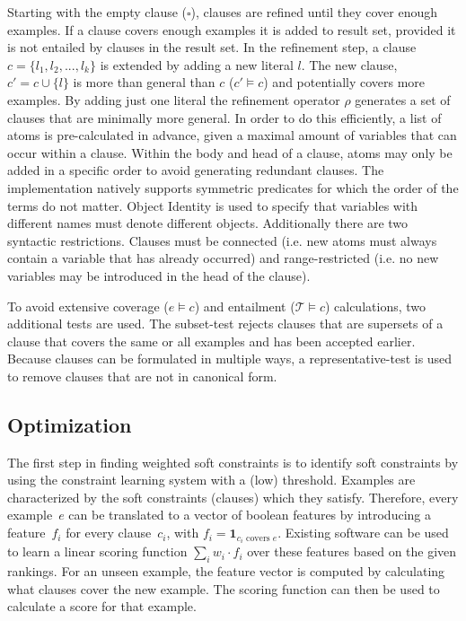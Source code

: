 \documentclass[letterpaper]{article}
\newcommand{\sym}[1]{\ensuremath{\mathcal{#1}}}
\theoremstyle{definition}
\begin{document}
Starting with the empty clause ($\square$), clauses are refined until they cover enough examples.
If a clause covers enough examples it is added to result set, provided it is not entailed by clauses in the result set.
In the refinement step, a clause $c = \{l_1, l_2, ..., l_k\}$ is extended by adding a new literal $l$.
The new clause, $c' = c \cup \{l\}$ is more than general than $c$ ($c' \models c$) and potentially covers more examples.
By adding just one literal the refinement operator $\rho$ generates a set of clauses that are minimally more general.
In order to do this efficiently, a list of atoms is pre-calculated in advance, given a maximal amount of variables that can occur within a clause.
Within the body and head of a clause, atoms may only be added in a specific order to avoid generating redundant clauses.
The implementation natively supports symmetric predicates for which the order of the terms do not matter.
Object Identity is used to specify that variables with different names must denote different objects.
Additionally there are two syntactic restrictions.
Clauses must be connected (i.e. new atoms must always contain a variable that has already occurred) and range-restricted (i.e. no new variables may be introduced in the head of the clause).

To avoid extensive coverage ($e \models c$) and entailment ($\sym{T} \models c$) calculations, two additional tests are used.
The subset-test rejects clauses that are supersets of a clause that covers the same or all examples and has been accepted earlier.
Because clauses can be formulated in multiple ways, a representative-test is used to remove clauses that are not in canonical form.


\subsection{Optimization}
The first step in finding weighted soft constraints is to identify soft constraints by using the constraint learning system with a (low) threshold.
Examples are characterized by the soft constraints (clauses) which they satisfy.
Therefore, every example~$e$ can be translated to a vector of boolean features by introducing a feature~$f_i$ for every clause~$c_i$, with $f_i = \mathbf{1}_{c_i \text{ covers } e}$.
Existing software can be used to learn a linear scoring function $\sum_i w_i \cdot f_i$ over these features based on the given rankings.
For an unseen example, the feature vector is computed by calculating what clauses cover the new example.
The scoring function can then be used to calculate a score for that example.
\end{document}
